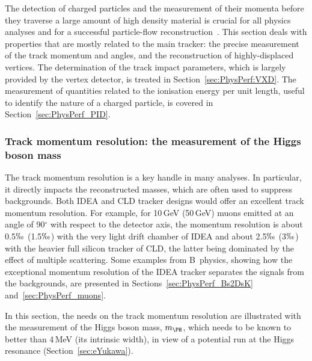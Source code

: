 The detection of charged particles and the measurement of their momenta before they traverse a large amount of high density material 
is crucial for all physics analyses and for a successful particle-flow reconstruction~\cite{MLPF_NOTE}. 
This section deals with properties that are mostly related to the main tracker: 
the precise measurement of the track momentum and angles, and the reconstruction of highly-displaced vertices. 
The determination of the track impact parameters, which is largely provided by the vertex detector, is treated in Section~\ref{sec:PhysPerf:VXD}. 
The measurement of quantities related to the ionisation energy per unit length, useful to identify the nature of a charged particle, 
is covered in Section~\ref{sec:PhysPerf_PID}.

\subsubsection{Track momentum resolution: the measurement of the Higgs boson mass}
\label{sec:PhysPerf_HiggsRecoil}

The track momentum resolution is a key handle in many analyses. 
In particular, it directly impacts the reconstructed masses, which are often used to suppress backgrounds. 
Both IDEA and CLD tracker designs would offer an excellent track momentum resolution. 
For example, for 10\,GeV (50\,GeV) muons emitted at an angle of 90$^{\circ}$ with respect to the detector axis, 
the momentum resolution is about 0.5$\permil$ (1.5$\permil$) with the very light drift chamber of IDEA 
and about 2.5$\permil$ (3$\permil$) with the heavier full silicon tracker of CLD, 
the latter being dominated by the effect of multiple scattering. 
Some examples from B~physics, showing how the exceptional momentum resolution of the IDEA tracker separates the signals from the backgrounds, 
are presented in Sections~\ref{sec:PhysPerf_Bs2DsK} and~\ref{sec:PhysPerf_muons}.

In this section, the needs on the track momentum resolution are illustrated with the measurement of the Higgs boson mass, $m_{\PH}$,
which needs to be known to better than 4\,MeV (its intrinsic width), 
in view of a potential run at the Higgs resonance (Section~\ref{sec:eYukawa}).


